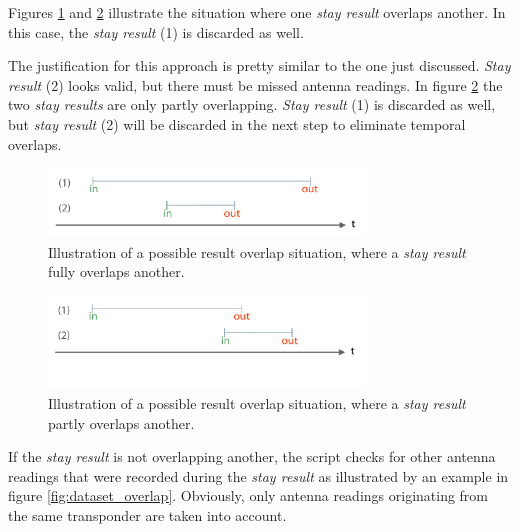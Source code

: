 Figures \ref{fig:result_overlap_single} and \ref{fig:result_overlap_single_shifted} illustrate the situation where one \textit{stay result} overlaps another. In this case, the \textit{stay result} (1) is discarded as well.

The justification for this approach is pretty similar to the one just discussed. \textit{Stay result} (2) looks valid, but there must be missed antenna readings. In figure \ref{fig:result_overlap_single_shifted} the two \textit{stay results} are only partly overlapping. \textit{Stay result} (1) is discarded as well, but \textit{stay result} (2) will be discarded in the next step to eliminate temporal overlaps.      

\begin{figure}[htpb]
\begin{center}
  \includegraphics[width=0.75\textwidth]{assets/pdf/result_overlaps_single_schema.pdf}
  \caption[Single result full overlap situation]{Illustration of a possible result overlap situation, where a \textit{stay result} fully overlaps another.}
  \label{fig:result_overlap_single}
\end{center}
\end{figure} 

\begin{figure}[htpb]
\begin{center}
  \includegraphics[width=0.75\textwidth]{assets/pdf/result_overlaps_single_shifted_schema.pdf}
  \caption[Single result partly overlap situation]{Illustration of a possible result overlap situation, where a \textit{stay result} partly overlaps another.}
  \label{fig:result_overlap_single_shifted}
\end{center}
\end{figure}

If the \textit{stay result} is not overlapping another, the script checks for other antenna readings that were recorded during the \textit{stay result} as illustrated by an example in figure \ref{fig:dataset_overlap}. Obviously, only antenna readings originating from the same transponder are taken into account.

